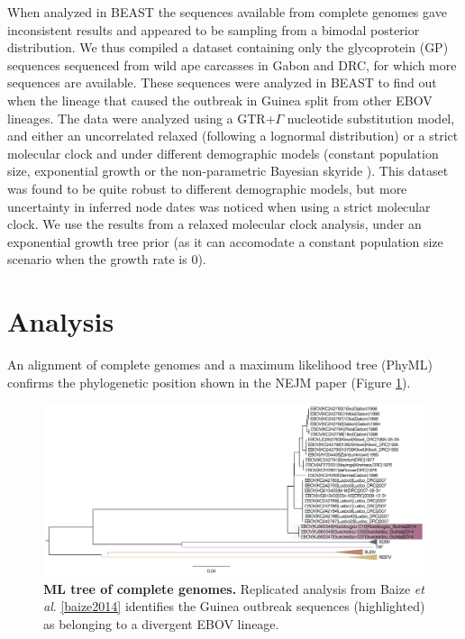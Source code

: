 \documentclass[11pt,oneside,letterpaper]{article}
\begin{document}
When analyzed in BEAST \cite{drummond2012} the sequences available from complete genomes gave inconsistent results and appeared to be sampling from a bimodal posterior distribution.
We thus compiled a dataset containing only the glycoprotein (GP) sequences sequenced from wild ape carcasses \cite{wittmann2007} in Gabon and DRC, for which more sequences are available.
These sequences were analyzed in BEAST \cite{drummond2012} to find out when the lineage that caused the outbreak in Guinea split from other EBOV lineages.
The data were analyzed using a GTR+$\Gamma$ nucleotide substitution model, and either an uncorrelated relaxed (following a lognormal distribution) \cite{drummond2006} or a strict molecular clock and under different demographic models (constant population size, exponential growth or the non-parametric Bayesian skyride \cite{minin2008}).
This dataset was found to be quite robust to different demographic models, but more uncertainty in inferred node dates was noticed when using a strict molecular clock.
We use the results from a relaxed molecular clock analysis, under an exponential growth tree prior (as it can accomodate a constant population size scenario when the growth rate is 0).

\section*{Analysis}
An alignment of complete genomes and a maximum likelihood tree (PhyML) confirms the phylogenetic position shown in the NEJM paper (Figure \ref{NEJMtree}).
\begin{figure}[h!]
\centering  
\includegraphics[width=1\textwidth]  {figures/ebolavirus_raw_ml_tree.png}
\caption{\textbf{ML tree of complete genomes.}
Replicated analysis from Baize \textit{et al}. \ref{baize2014} identifies the Guinea outbreak sequences (highlighted) as belonging to a divergent EBOV lineage.}
\label{NEJMtree}
\end{figure}
\end{document}

